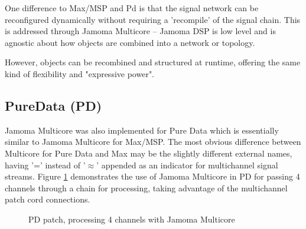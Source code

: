 \documentclass[twoside,a4paper]{article}
\begin{document}



One difference to Max/MSP and Pd is that the signal network can be reconfigured dynamically without requiring a 'recompile' of the signal chain.  
This is addressed through Jamoma Multicore -- Jamoma DSP is low level and is agnostic about how objects are combined into a network or topology.

However, objects can be recombined and structured at runtime, offering the same kind of flexibility and "expressive power".


\subsection{PureData (PD)} %

Jamoma Multicore was also implemented for Pure Data which is essentially similar to Jamoma Multicore for Max/MSP. 
The most obvious difference between Multicore for Pure Data and Max may be the slightly different external names, having '=' instead of '$\approx$' appended as an indicator for multichannel signal streams. 
Figure \ref{fig:pd} demonstrates the use of Jamoma Multicore in PD for passing 4 channels through a chain for processing, taking advantage of the multichannel patch cord connections.  

\begin{figure}[htbp]
\centerline{}
\caption{PD patch, processing 4 channels with Jamoma Multicore}
\label{fig:pd}
\end{figure}
\end{document}
